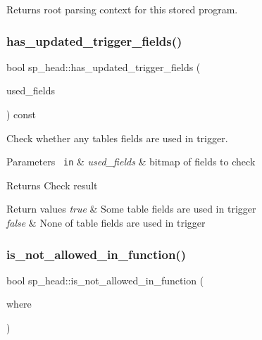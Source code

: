 \begin{DoxyReturn}{Returns}
root parsing context for this stored program. 
\end{DoxyReturn}
\mbox{\label{classsp__head_a2b7d48622761c9aef8c72a322791d771}} 
\subsubsection{\texorpdfstring{has\+\_\+updated\+\_\+trigger\+\_\+fields()}{has\_updated\_trigger\_fields()}}
{\footnotesize\ttfamily bool sp\+\_\+head\+::has\+\_\+updated\+\_\+trigger\+\_\+fields (\begin{DoxyParamCaption}\item[{const M\+Y\+\_\+\+B\+I\+T\+M\+AP $\ast$}]{used\+\_\+fields }\end{DoxyParamCaption}) const}

Check whether any table\textquotesingle{}s fields are used in trigger.


\begin{DoxyParams}[1]{Parameters}
\mbox{\texttt{ in}}  & {\em used\+\_\+fields} & bitmap of fields to check\\
\hline
\end{DoxyParams}
\begin{DoxyReturn}{Returns}
Check result 
\end{DoxyReturn}

\begin{DoxyRetVals}{Return values}
{\em true} & Some table fields are used in trigger \\
\hline
{\em false} & None of table fields are used in trigger \\
\hline
\end{DoxyRetVals}
\mbox{\label{classsp__head_a7ce7aa5389adb5438b6fe84e08846f97}} 
\subsubsection{\texorpdfstring{is\+\_\+not\+\_\+allowed\+\_\+in\+\_\+function()}{is\_not\_allowed\_in\_function()}}
{\footnotesize\ttfamily bool sp\+\_\+head\+::is\+\_\+not\+\_\+allowed\+\_\+in\+\_\+function (\begin{DoxyParamCaption}\item[{const char $\ast$}]{where }\end{DoxyParamCaption})\hspace{0.3cm}{\ttfamily [inline]}}

